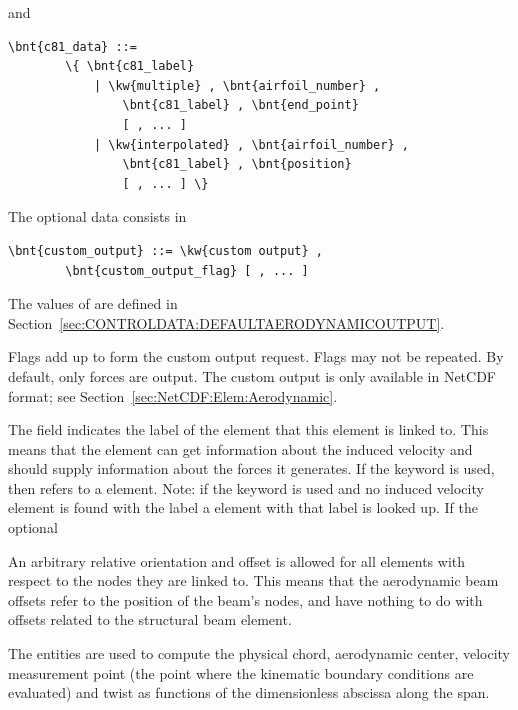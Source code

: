 and
\begin{Verbatim}[commandchars=\\\{\}]
    \bnt{c81_data} ::=
        \{ \bnt{c81_label}
            | \kw{multiple} , \bnt{airfoil_number} ,
                \bnt{c81_label} , \bnt{end_point}
                [ , ... ]
            | \kw{interpolated} , \bnt{airfoil_number} ,
                \bnt{c81_label} , \bnt{position}
                [ , ... ] \}
\end{Verbatim}
The  optional data consists in
\begin{Verbatim}[commandchars=\\\{\}]
    \bnt{custom_output} ::= \kw{custom output} , 
        \bnt{custom_output_flag} [ , ... ]
\end{Verbatim}
The values of 
are defined in Section~\ref{sec:CONTROLDATA:DEFAULTAERODYNAMICOUTPUT}.

Flags add up to form the custom output request.
Flags may not be repeated.
By default, only forces are output.
The custom output is only available in NetCDF format;
see Section~\ref{sec:NetCDF:Elem:Aerodynamic}.

The field  indicates the label
of the  element that this element is linked to.
This means that the element can get information about the
induced velocity and should supply information about the forces it generates.
If the keyword  is used,
then  refers to a  element.
Note: if the keyword  is used
and no induced velocity element is found with the label 
a  element with that label is looked up.
If the optional 

An arbitrary relative orientation and offset is allowed for all elements with
respect to the nodes they are linked to. 
This means that the aerodynamic beam offsets refer to the position
of the beam's nodes, and have nothing to do with offsets related
to the structural beam element.

The  entities are used to compute the physical chord,
aerodynamic center, velocity measurement point (the point where the
kinematic boundary conditions are evaluated) and twist as functions 
of the dimensionless abscissa along the span.

